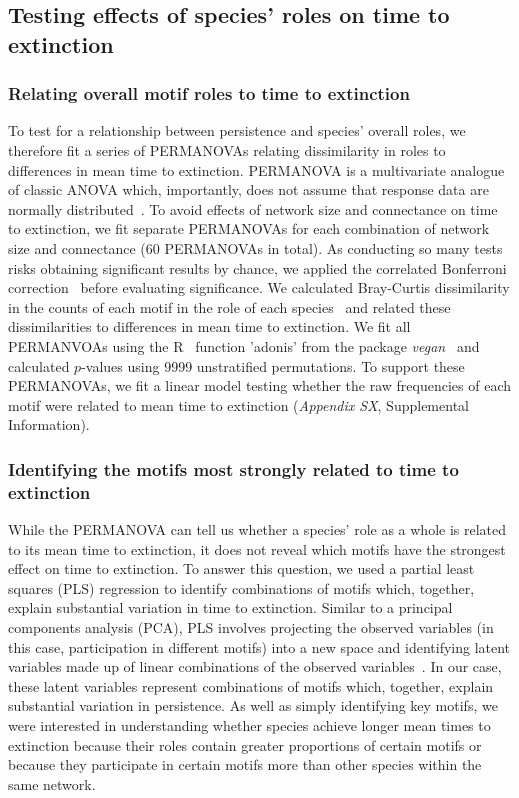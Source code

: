 \documentclass[12pt]{article}
\begin{document}
	\subsection*{Testing effects of species' roles on time to extinction}

		\subsubsection*{Relating overall motif roles to time to extinction}

			To test for a relationship between persistence and species' overall roles, we therefore fit a series of PERMANOVAs relating dissimilarity in roles to differences in mean time to extinction.
			PERMANOVA is a multivariate analogue of classic ANOVA which, importantly, does not assume that response data are normally distributed~\citep{Anderson2001}.
			To avoid effects of network size and connectance on time to extinction, we fit separate PERMANOVAs for each combination of network size and connectance (60 PERMANOVAs in total).
			As conducting so many tests risks obtaining significant results by chance, we applied the correlated Bonferroni correction~\citep{Drezner2016} before evaluating significance.
			We calculated Bray-Curtis dissimilarity in the counts of each motif in the role of each species~\citep{Baker2015,Cirtwill2015} and related these dissimilarities to differences in mean time to extinction.
			We fit all PERMANVOAs using the R~\citep{R} function 'adonis' from the package \emph{vegan}~\citep{vegan} and calculated $p$-values using 9999 unstratified permutations.
            To support these PERMANOVAs, we fit a linear model testing whether the raw frequencies of each motif were related to mean time to extinction (\emph{Appendix SX}, Supplemental Information).


		\subsubsection*{Identifying the motifs most strongly related to time to extinction}

			While the PERMANOVA can tell us whether a species' role as a whole is related to its mean time to extinction, it does not reveal which motifs have the strongest effect on time to extinction.
			To answer this question, we used a partial least squares (PLS) regression to identify combinations of motifs which, together, explain substantial variation in time to extinction. 
			Similar to a principal components analysis (PCA), PLS involves projecting the observed variables (in this case, participation in different motifs) into a new space and identifying latent variables made up of linear combinations of the observed variables~\citep{Mevik2007}.
			In our case, these latent variables represent combinations of motifs which, together, explain substantial variation in persistence.
			As well as simply identifying key motifs, we were interested in understanding whether species achieve longer mean times to extinction because their roles contain greater proportions of certain motifs or because they participate in certain motifs more than other species within the same network.
			
\end{document}

